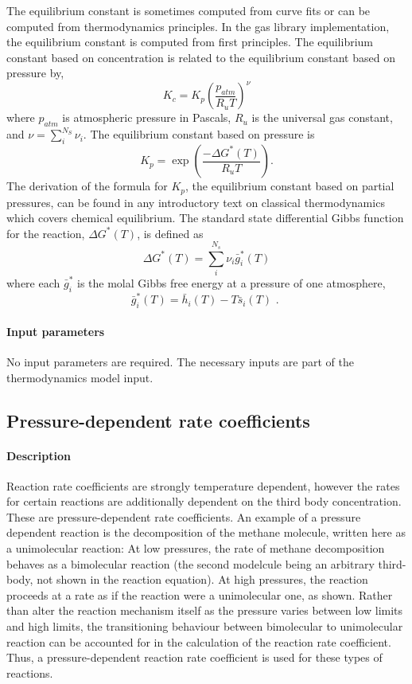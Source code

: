 The equilibrium constant is sometimes computed from curve fits
or can be computed from thermodynamics principles.
In the gas library implementation, the equilibrium constant
is computed from first principles.
The equilibrium constant based on concentration is related to the equilibrium constant
based on pressure by,
\begin{equation}
K_c = K_p \left( \frac{p_{atm}}{R_uT} \right)^{\nu}
\end{equation}
where $p_{atm}$ is atmospheric pressure in Pascals, $R_u$ is the universal
gas constant, and $\nu = \sum_i^{N_S} \nu_i$.
The equilibrium constant based on pressure is
\begin{equation}
K_p = \exp{\left( \frac{-\Delta G^*(T)}{R_uT} \right) }.
\end{equation}
The derivation of the formula for $K_p$,
the equilibrium constant based on partial pressures,
can be found in any introductory text on classical thermodynamics
which covers chemical equilibrium.
The standard state differential Gibbs function for the reaction,
$\Delta G^*(T)$, is defined as
\begin{equation}
\Delta G^*(T) = \sum_i^{N_s} \nu_i \bar{g}_i^*(T)
\end{equation}
where each $\bar{g}_i^*$ is the molal Gibbs free energy 
at a pressure of one atmosphere,
\begin{equation}
\bar{g}_i^*(T) = \bar{h}_i(T) - T \bar{s}_i(T) \text{ . }
\end{equation}

\paragraph{Input parameters}
No input parameters are required.
The necessary inputs are part of the thermodynamics
model input.

\subsection{Pressure-dependent rate coefficients}
\paragraph{Description}
Reaction rate coefficients are strongly temperature dependent,
however the rates for certain reactions are additionally
dependent on the third body concentration.
These are pressure-dependent rate coefficients.
An example of a pressure dependent reaction is the
decomposition of the methane molecule, written
here as a unimolecular reaction:
At low pressures, the rate of methane decomposition behaves as a bimolecular
reaction (the second modelcule being an arbitrary third-body, not shown
in the reaction equation).
At high pressures, the reaction proceeds at a rate as if the reaction
were a unimolecular one, as shown.
Rather than alter the reaction mechanism itself as the
pressure varies between low limits and high limits,
the transitioning behaviour between bimolecular to unimolecular reaction can be
accounted for in the calculation of the reaction rate coefficient.
Thus, a pressure-dependent reaction rate coefficient is used for these
types of reactions.

